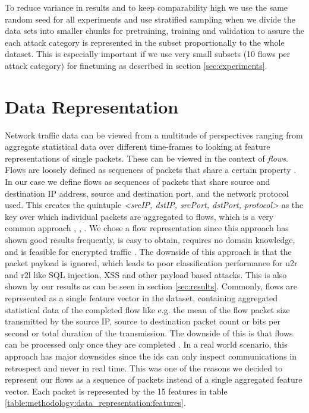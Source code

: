 To reduce variance in results and to keep comparability high we use the same random seed for all experiments and use stratified sampling when we divide the data sets into smaller chunks for pretraining, training and validation to assure the each attack category is represented in the subset proportionally to the whole dataset. This is especially important if we use very small subsets (10 flows per attack category) for finetuning as described in section \ref{sec:experiments}. 

\section{Data Representation}

Network traffic data can be viewed from a multitude of perspectives ranging from aggregate statistical data over different time-frames \cite{kitsune} to looking at feature representations of single packets. These can be viewed in the context of \textit{flows}.
Flows are loosely defined as sequences of packets that share a certain property \cite{adversarial_recurrent_ids}. In our case we define flows as sequences of packets that share source and destination IP address, source and destination port, and the network protocol used. This creates the quintuple \textit{<srcIP, dstIP, srcPort, dstPort, protocol>} as the key over which individual packets are aggregated to flows, which is a very common approach \cite{caia_vector}, \cite{unsw_nb15}, \cite{feature_vectors}. We chose a flow representation since this approach has shown good results frequently, is easy to obtain, requires no domain knowledge, and is feasible for encrypted traffic \cite{feature_vectors}. The downside of this approach is that the packet payload is ignored, which leads to poor classification performance for \gls{u2r} and \gls{r2l} \cite{nsl_kdd} like SQL injection, XSS and other payload based attacks. This is also shown by our results as can be seen in section \ref{sec:results}.
Commonly, flows are represented as a single feature vector in the dataset, containing aggregated statistical data of the completed flow like e.g. the mean of the flow packet size transmitted by the source IP, source to destination packet count or bits per second or total duration of the transmission. The downside of this is that flows can be processed only once they are completed \cite{adversarial_recurrent_ids}. In a real world scenario, this approach has major downsides since the \gls{ids} can only inspect communications in retrospect and never in real time. This was one of the reasons we decided to represent our flows as a sequence of packets instead of a single aggregated feature vector. Each packet is represented by the 15 features in table \ref{table:methodology:data_representation:features}.

